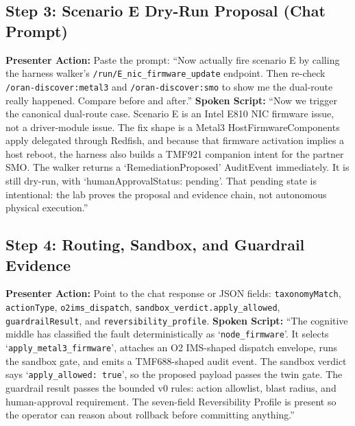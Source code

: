 \documentclass[10pt,a4paper]{article}
\begin{document}
\subsection*{Step 3: Scenario E Dry-Run Proposal (Chat Prompt)}
\textbf{Presenter Action:} Paste the prompt: ``Now actually fire scenario E by calling the harness walker's \texttt{/run/E\_nic\_firmware\_update} endpoint. Then re-check \texttt{/oran-discover:metal3} and \texttt{/oran-discover:smo} to show me the dual-route really happened. Compare before and after.''
\newline\textbf{Spoken Script:}
``Now we trigger the canonical dual-route case. Scenario E is an Intel E810 NIC firmware issue, not a driver-module issue. The fix shape is a Metal3 HostFirmwareComponents apply delegated through Redfish, and because that firmware activation implies a host reboot, the harness also builds a TMF921 companion intent for the partner SMO. The walker returns a `RemediationProposed' AuditEvent immediately. It is still dry-run, with `humanApprovalStatus: pending'. That pending state is intentional: the lab proves the proposal and evidence chain, not autonomous physical execution.''

\subsection*{Step 4: Routing, Sandbox, and Guardrail Evidence}
\textbf{Presenter Action:} Point to the chat response or JSON fields: \texttt{taxonomyMatch}, \texttt{actionType}, \texttt{o2ims\_dispatch}, \texttt{sandbox\_verdict.apply\_allowed}, \texttt{guardrailResult}, and \texttt{reversibility\_profile}.
\newline\textbf{Spoken Script:}
``The cognitive middle has classified the fault deterministically as `\texttt{node\_firmware}'. It selects `\texttt{apply\_metal3\_firmware}', attaches an O2 IMS-shaped dispatch envelope, runs the sandbox gate, and emits a TMF688-shaped audit event. The sandbox verdict says `\texttt{apply\_allowed: true}', so the proposed payload passes the twin gate. The guardrail result passes the bounded v0 rules: action allowlist, blast radius, and human-approval requirement. The seven-field Reversibility Profile is present so the operator can reason about rollback before committing anything.''
\end{document}
